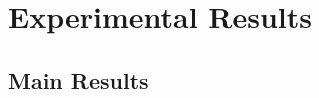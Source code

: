 \documentclass[authoryear,preprint,review,12pt]{elsarticle}
\begin{document}
\section{Experimental Results}
\subsection{Main Results} 
\begin{table}[t]
\centering
\caption{\textbf{Comparison of automatic and human evaluations among different methods} on MSC and Carecall datasets, reporting the quality of generated response. The ``BScore'', ``Enga.'', ``Cohe'' and ``Cons'' are the abbreviations of BertScore, Engagingness, Coherence, and Consistency. The best value is \textbf{bolded}.}
\label{tab:msc}
\end{table}
\end{document}
